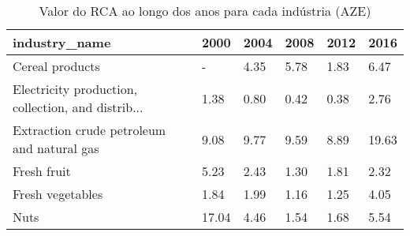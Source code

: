 \begin{table}
\centering
\caption{Valor do RCA ao longo dos anos para cada indústria (AZE)}
\begin{tabular}{p{6cm}p{1.5cm}p{1.5cm}p{1.5cm}p{1.5cm}p{1.5cm}}
\toprule
                                     industry\_name &  2000 & 2004 & 2008 & 2012 &  2016 \\
\midrule
                                   Cereal products &     - & 4.35 & 5.78 & 1.83 &  6.47 \\
Electricity production, collection, and distrib... &  1.38 & 0.80 & 0.42 & 0.38 &  2.76 \\
        Extraction crude petroleum and natural gas &  9.08 & 9.77 & 9.59 & 8.89 & 19.63 \\
                                       Fresh fruit &  5.23 & 2.43 & 1.30 & 1.81 &  2.32 \\
                                  Fresh vegetables &  1.84 & 1.99 & 1.16 & 1.25 &  4.05 \\
                                              Nuts & 17.04 & 4.46 & 1.54 & 1.68 &  5.54 \\
\bottomrule
\end{tabular}
\end{table}
